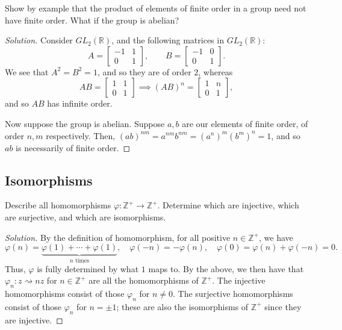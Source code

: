 \documentclass[12pt]{article}
\theoremstyle{remark}
\newcommand{\GL}{\mathit{GL}}
\begin{document}
\begin{problem}
  Show by example that the product of elements of finite order in a group need not have finite order. What if the group is abelian?
\end{problem}
\begin{proof}[Solution]
  Consider $\GL_2(\mathbb{R})$, and the following matrices in $\GL_2(\mathbb{R})$:
  \begin{equation*}
    A = \begin{bmatrix}
      -1 & 1\\
      0 & 1
    \end{bmatrix}, \qquad
    B = \begin{bmatrix}
      -1 & 0\\
      0 & 1
    \end{bmatrix}.
  \end{equation*}
  We see that $A^2 = B^2 = 1$, and so they are of order $2$, whereas
  \begin{equation*}
    AB = \begin{bmatrix}
      1 & 1\\
      0 & 1
    \end{bmatrix} \implies
    (AB)^n = \begin{bmatrix}
      1 & n\\
      0 & 1
    \end{bmatrix},
  \end{equation*}
  and so $AB$ has infinite order.
  \par Now suppose the group is abelian. Suppose $a,b$ are our elements of finite order, of order $n,m$ respectively. Then, $(ab)^{nm} = a^{nm}b^{nm} = (a^n)^m(b^m)^n = 1$, and so $ab$ is necessarily of finite order.
\end{proof}

\setcounter{subsection}{5}
\subsection{Isomorphisms}
\setcounter{subsubsection}{1}
\begin{problem}\label{exc:2.6.2}
  Describe all homomorphisms $\varphi\colon \mathbb{Z}^+ \to \mathbb{Z}^+$. Determine which are injective, which are surjective, and which are isomorphisms.
\end{problem}
\begin{proof}[Solution]
  By the definition of homomorphism, for all positive $n \in \mathbb{Z}^+$, we have
  \begin{equation*}
    \varphi(n) = \underbrace{\varphi(1) + \cdots + \varphi(1)}_{\text{$n$ times}}, \quad \varphi(-n) = -\varphi(n), \quad \varphi(0) = \varphi(n) + \varphi(-n) = 0.
  \end{equation*}
  Thus, $\varphi$ is fully determined by what $1$ maps to. By the above, we then have that $\varphi_n: z \rightsquigarrow nz$ for $n \in \mathbb{Z}^+$ are all the homomorphisms of $\mathbb{Z}^+$. The injective homomorphisms consist of those $\varphi_n$ for $n \ne 0$. The surjective homomorphisms consist of those $\varphi_n$ for $n = \pm1$; these are also the isomorphisms of $\mathbb{Z}^+$ since they are injective.
\end{proof}
\end{document}
